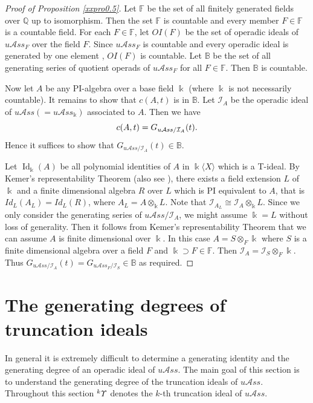 \documentclass{amsart}
\theoremstyle{definition}
\theoremstyle{remark}
\numberwithin{equation}{section}
\newcommand{\lr}[1]{\langle #1 \rangle}
\newcommand{\up}[1]{{^{#1}{\it \!\Upsilon}}}
\def \uas{u\mathcal{A}ss}
\def \I{\mathcal{I}}
\def \Id{\operatorname{Id}}
\begin{document}
\begin{proof}[Proof of Proposition \ref{xxpro0.5}]
Let ${\mathbb F}$ be the set of all finitely generated 
fields over ${\mathbb Q}$ up to isomorphism. Then 
the set ${\mathbb F}$ is countable and every member 
$F\in {\mathbb F}$ is a countable field. For each 
$F\in {\mathbb F}$, let $OI(F)$ be the set of operadic 
ideals of $\uas_F$ over the field $F$. Since $\uas_F$ 
is countable and every operadic ideal is generated 
by one element \cite[Theorem 0.3(2)]{BXYZZ}, $OI(F)$ 
is countable. Let ${\mathbb B}$ be the set of all 
generating series of quotient operads of $\uas_F$ 
for all $F\in {\mathbb F}$. 
Then ${\mathbb B}$ is countable. 

Now let $A$ be any PI-algebra over a base field 
$\Bbbk$ (where $\Bbbk$ is not necessarily countable).
It remains to show that $c(A,t)$ is in ${\mathbb B}$. 
Let $\I_{A}$ be the operadic ideal of $\uas(=\uas_{\Bbbk})$
associated to $A$. Then we have
\begin{equation}
\notag %
c(A,t)=G_{\uas/\I_A}(t).
\end{equation}
Hence it suffices to show that $G_{\uas/\I_A}(t)
\in {\mathbb B}$.

Let $\Id_{\Bbbk}(A)$ be all polynomial identities of $A$ 
in $\Bbbk\lr{X}$ which is a T-ideal. By Kemer's 
representability Theorem \cite{Ke} (also see 
\cite[Theorem 1.1]{AKK}), there exists a field extension 
$L$ of $\Bbbk$ and a finite dimensional algebra $R$ over 
$L$ which is PI equivalent to $A$, that is $Id_{L}(A_L) 
=Id_{L}(R)$, where $A_L=A\otimes_{\Bbbk}L$. Note that
$\I_{A_L}\cong \I_{A}\otimes_{\Bbbk} L$. Since 
we only consider the generating series of
$\uas/\I_A$, we might assume $\Bbbk=L$ without loss of
generality. Then it follows from Kemer's 
representability Theorem that we can assume $A$ is finite
dimensional over $\Bbbk$. In this case $A=S \otimes_F \Bbbk$
where $S$ is a finite dimensional algebra over a field 
$F$ and $\Bbbk\supset F\in {\mathbb F}$. Then 
$\I_{A}=\I_{S}\otimes_{F} \Bbbk$. Thus $G_{\uas/\I_A}(t)
=G_{\uas_{F}/\I_S}\in {\mathbb B}$ as required.
\end{proof}


\section{The generating degrees of truncation ideals}
\label{yysec3}

In general it is extremely difficult to determine a 
generating identity and the generating degree of an 
operadic ideal of $\uas$. The main goal of this 
section is to understand the generating degree of 
the truncation ideals of $\uas$. Throughout this 
section $\up{k}$ denotes the $k$-th truncation ideal of $\uas$. 
\end{document}
